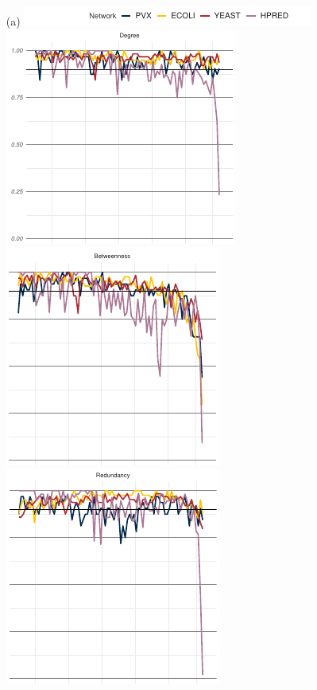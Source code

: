 \begin{figure}
    \begin{enumerate}
        \item[(a)] \includegraphics[scale=1.02]{plot_rank_similarity_papertop.pdf}\\
        \includegraphics[scale=1.02]{plot_rank_similarity_paper_degree.pdf}\hspace*{0.1mm}\includegraphics[scale=1.02]{plot_rank_similarity_paper_betweenness.pdf}\hspace*{-0.4mm}\includegraphics[scale=1.02]{plot_rank_similarity_paper_redundancy.pdf}\\

\end{enumerate}
\end{figure}
